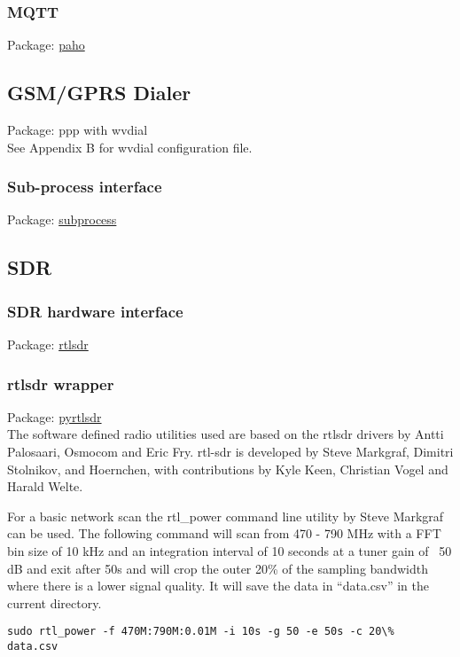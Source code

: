 \subsubsection{MQTT}
Package:	\href{https://eclipse.org/paho/clients/python/}{paho}\\

\subsection{GSM/GPRS Dialer}
Package: 	ppp with wvdial\\
See Appendix B for wvdial configuration file.

\subsubsection{Sub-process interface}
Package:	\href{https://docs.python.org/2/library/subprocess.html}{subprocess}\\

\subsection{SDR}
\subsubsection{SDR hardware interface}
Package:	\href{https://github.com/steve-m/librtlsdr}{rtlsdr}\\

\subsubsection{rtlsdr wrapper}
Package:	\href{https://github.com/roger-/pyrtlsdr}{pyrtlsdr}\\
The software defined radio utilities used are based on the rtlsdr drivers by Antti Palosaari, Osmocom and Eric Fry. rtl-sdr is developed by Steve Markgraf, Dimitri Stolnikov, and Hoernchen, with contributions by Kyle Keen, Christian Vogel and Harald Welte.

For a basic network scan the rtl\_power command line utility by Steve Markgraf can be used. The following command will scan from 470 - 790 MHz with a FFT bin size of 10 kHz and an integration interval of 10 seconds at a tuner gain of ~50 dB and exit after 50s and will crop the outer 20\% of the sampling bandwidth where there is a lower signal quality. It will save the data in “data.csv” in the current directory.
\begin{lstlisting}
sudo rtl_power -f 470M:790M:0.01M -i 10s -g 50 -e 50s -c 20\%  data.csv
\end{lstlisting}

